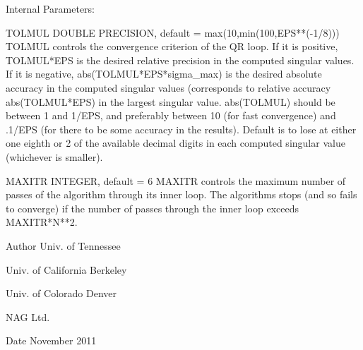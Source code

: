 \begin{DoxyParagraph}{Internal Parameters\+: }
\begin{DoxyVerb}  TOLMUL  DOUBLE PRECISION, default = max(10,min(100,EPS**(-1/8)))
          TOLMUL controls the convergence criterion of the QR loop.
          If it is positive, TOLMUL*EPS is the desired relative
             precision in the computed singular values.
          If it is negative, abs(TOLMUL*EPS*sigma_max) is the
             desired absolute accuracy in the computed singular
             values (corresponds to relative accuracy
             abs(TOLMUL*EPS) in the largest singular value.
          abs(TOLMUL) should be between 1 and 1/EPS, and preferably
             between 10 (for fast convergence) and .1/EPS
             (for there to be some accuracy in the results).
          Default is to lose at either one eighth or 2 of the
             available decimal digits in each computed singular value
             (whichever is smaller).

  MAXITR  INTEGER, default = 6
          MAXITR controls the maximum number of passes of the
          algorithm through its inner loop. The algorithms stops
          (and so fails to converge) if the number of passes
          through the inner loop exceeds MAXITR*N**2.\end{DoxyVerb}
 
\end{DoxyParagraph}
\begin{DoxyAuthor}{Author}
Univ. of Tennessee 

Univ. of California Berkeley 

Univ. of Colorado Denver 

N\+A\+G Ltd. 
\end{DoxyAuthor}
\begin{DoxyDate}{Date}
November 2011 
\end{DoxyDate}
